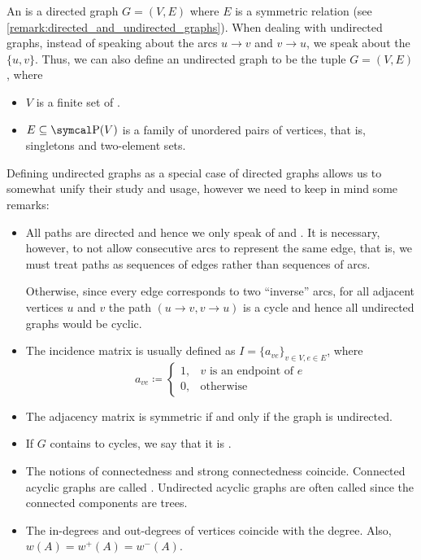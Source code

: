 \begin{definition}\label{def:undirected_graph}
  An  is a directed graph \( G = (V, E) \) where \( E \) is a symmetric relation (see \cref{remark:directed_and_undirected_graphs}). When dealing with undirected graphs, instead of speaking about the arcs \( u \to v \) and \( v \to u \), we speak about the  \( \{ u, v \} \). Thus, we can also define an undirected graph to be the tuple \( G = (V, E) \), where
  \begin{itemize}
    \item \( V \) is a finite set of .
    \item \( E \subseteq \Power(V) \) is a family of unordered pairs of vertices, that is, singletons and two-element sets.
  \end{itemize}

  Defining undirected graphs as a special case of directed graphs allows us to somewhat unify their study and usage, however we need to keep in mind some remarks:
  \begin{itemize}
    \item All paths are directed and hence we only speak of  and . It is necessary, however, to not allow consecutive arcs to represent the same edge, that is, we must treat paths as sequences of edges rather than sequences of arcs.

    Otherwise, since every edge corresponds to two \enquote{inverse} arcs, for all adjacent vertices \( u \) and \( v \) the path \( (u \to v, v \to u) \) is a cycle and hence all undirected graphs would be cyclic.

    \item The incidence matrix is usually defined as \( I = \{ a_{ve} \}_{v \in V, e \in E} \), where
    \begin{equation*}
      a_{ve} \coloneqq \begin{cases}
        1, &v \text{ is an endpoint of } e \\
        0, &\text{otherwise}
      \end{cases}
    \end{equation*}

    \item The adjacency matrix is symmetric if and only if the graph is undirected.

    \item If \( G \) contains to cycles, we say that it is .

    \item The notions of connectedness and strong connectedness coincide. Connected acyclic graphs are called . Undirected acyclic graphs are often called  since the connected components are trees.

    \item The in-degrees and out-degrees of vertices coincide with the degree. Also, \( w(A) = w^+(A) = w^-(A) \).
  \end{itemize}
\end{definition}


